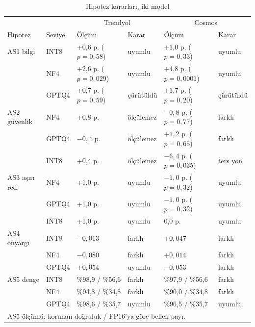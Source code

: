 \documentclass[conference]{IEEEtran}
\begin{document}
\begin{table}[htbp]
\caption{Hipotez kararları, iki model}
\label{tab:hipotezler}
\centering
\footnotesize
\setlength{\tabcolsep}{3pt}
\begin{tabular}{llp{1.75cm}lp{1.75cm}l}
\hline
 & & \multicolumn{2}{c}{Trendyol} & \multicolumn{2}{c}{Cosmos} \\
Hipotez & Seviye & Ölçüm & Karar & Ölçüm & Karar \\
\hline
AS1 bilgi & INT8 & +0,6 p. ($p=0{,}58$) & uyumlu & +1,0 p. ($p=0{,}33$) & uyumlu \\
          & NF4 & +2,6 p. ($p=0{,}029$) & uyumlu & +4,8 p. ($p=0{,}0001$) & uyumlu \\
          & GPTQ4 & +0,7 p. ($p=0{,}59$) & çürütüldü & +1,7 p. ($p=0{,}20$) & çürütüldü \\
AS2 güvenlik & NF4 & +0,8 p. & ölçülemez & $-0{,}8$ p. ($p=0{,}77$) & farklı \\
 & GPTQ4 & $-0{,}4$ p. & ölçülemez & $+1{,}2$ p. ($p=0{,}65$) & farklı \\
 & INT8 & +0,4 p. & ölçülemez & $-6{,}4$ p. ($p=0{,}035$) & ters yön \\
AS3 aşırı red. & NF4 & +1,0 p. & uyumlu & $-1{,}0$ p. ($p=0{,}32$) & uyumlu \\
 & GPTQ4 & +1,0 p. & uyumlu & $-1{,}0$ p. ($p=0{,}32$) & uyumlu \\
 & INT8 & +1,0 p. & uyumlu & 0,0 p. & uyumlu \\
AS4 önyargı & INT8 & $-0{,}013$ & farklı & $+0{,}047$ & farklı \\
            & NF4 & $-0{,}080$ & farklı & $+0{,}014$ & farklı \\
            & GPTQ4 & $+0{,}054$ & uyumlu & $-0{,}053$ & farklı \\
AS5 denge & INT8 & \%98,9 / \%56,6 & farklı & \%97,9 / \%56,6 & farklı \\
          & NF4 & \%94,8 / \%34,8 & farklı & \%90,0 / \%34,8 & farklı \\
          & GPTQ4 & \%98,6 / \%35,7 & uyumlu & \%96,5 / \%35,7 & uyumlu \\
\hline
\multicolumn{6}{l}{\scriptsize AS5 ölçümü: korunan doğruluk / FP16'ya göre bellek payı.} \\
\end{tabular}
\end{table}
\end{document}
